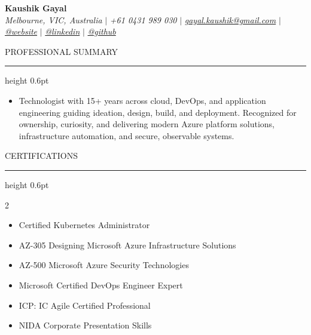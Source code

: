 \documentclass[letterpaper,10pt]{article}
\newcommand{\ResumeName}[1]{\textbf{\fontsize{18pt}{20pt}\selectfont #1}}
\newcommand{\ResumeSection}[1]{\par{\fontsize{11pt}{13pt}\selectfont \MakeUppercase{#1}}\vspace{1pt}\hrule height 0.6pt}
\newcommand{\SectionContentGap}{}
\begin{document}
\begin{flushleft}
    \ResumeName{Kaushik Gayal} \\
    \textit{Melbourne, VIC, Australia} $|$ 
    \textit{+61 0431 989 030} $|$  
    \href{mailto:gayal.kaushik@gmail.com}{\textit{gayal.kaushik@gmail.com}} $|$
    \href{ https://kaushik.gayal.dev }{\textit{@website}} $|$
    \href{ https://www.linkedin.com/in/kaushik-gayal-02a57316/ }{\textit{@linkedin}} $|$
    \href{ https://github.com/koshikg }{\textit{@github}}
    \vspace{-8pt}
\end{flushleft}

\ResumeSection{Professional Summary}
\vspace{-4pt}
\begin{itemize}[leftmargin=0.15in, label={}]
    \item{Technologist with 15+ years across cloud, DevOps, and application engineering guiding ideation, design, build, and deployment. Recognized for ownership, curiosity, and delivering modern Azure platform solutions, infrastructure automation, and secure, observable systems.}
\end{itemize}
\SectionContentGap

\ResumeSection{Certifications}\vspace{-8pt}
\begin{multicols}{2}
\begin{itemize}[leftmargin=0.1in, itemsep=0pt, parsep=0pt, topsep=0pt]
\item {Certified Kubernetes Administrator}
\item {AZ-305 Designing Microsoft Azure Infrastructure Solutions}
\item {AZ-500 Microsoft Azure Security Technologies}
\item {Microsoft Certified DevOps Engineer Expert}
\item {ICP: IC Agile Certified Professional}
\item {NIDA Corporate Presentation Skills}
\end{itemize}
\end{multicols}
\SectionContentGap
\end{document}

